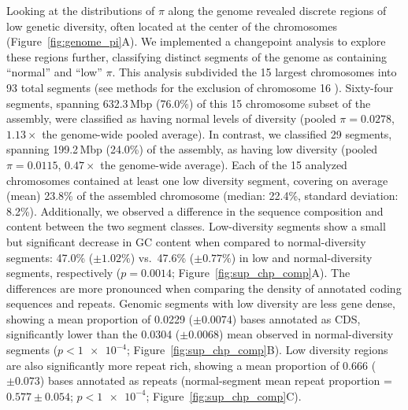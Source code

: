 Looking at the distributions of $\pi$ along the \bgla{} genome revealed discrete regions
of low genetic diversity, often located at the center of the chromosomes
(Figure~\ref{fig:genome_pi}A).
We implemented a changepoint analysis to explore these regions further, classifying
distinct segments of the genome as containing ``normal'' and ``low'' $\pi$.
This analysis subdivided the 15 largest chromosomes into 93 total segments (see
methods for the exclusion of chromosome 16 ).
Sixty-four segments, spanning 632.3\,Mbp (76.0\%) of this 15 chromosome subset of the
assembly, were classified as having normal levels of diversity (pooled $\pi = 0.0278$,
$1.13 \times$ the genome-wide pooled average).
In contrast, we classified 29 segments, spanning 199.2\,Mbp (24.0\%) of the assembly,
as having low diversity (pooled $\pi = 0.0115$, $0.47 \times$ the genome-wide average).
Each of the 15 analyzed chromosomes contained at least one low diversity segment, covering
on average (mean) 23.8\% of the assembled chromosome (median: 22.4\%, standard deviation: 8.2\%).
Additionally, we observed a difference in the sequence composition and content between the two
segment classes.
Low-diversity segments show a small but significant decrease in GC content when compared
to normal-diversity segments: 47.0\% ($\pm 1.02\%$) vs.\ 47.6\% ($\pm 0.77\%$) in low and
normal-diversity segments, respectively ($p = 0.0014$; Figure~\ref{fig:sup_chp_comp}A).
The differences are more pronounced when comparing the density of annotated coding sequences
and repeats.
Genomic segments with low diversity are less gene dense, showing a mean proportion of 0.0229
($\pm 0.0074$) bases annotated as CDS, significantly lower than the 0.0304 ($\pm 0.0068$) mean
observed in normal-diversity segments ($p < \num{1e-4}$; Figure~\ref{fig:sup_chp_comp}B).
Low diversity regions are also significantly more repeat rich, showing a mean proportion of
0.666 ($\pm 0.073$) bases annotated as repeats (normal-segment mean repeat proportion =
$0.577 \pm 0.054$; $p < \num{1e-4}$; Figure~\ref{fig:sup_chp_comp}C).
\vspace{0.1cm}

